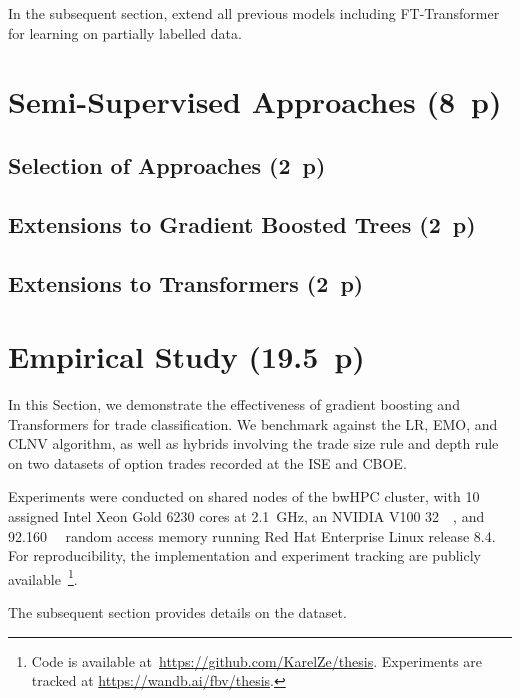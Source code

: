In the subsequent section, extend all previous models including FT-Transformer for learning on partially labelled data.

\newpage
\section{Semi-Supervised Approaches (8~p)}\label{sec:semi-supervised-approaches}

\subsection{Selection of Approaches (2~p)}\label{sec:selection-of-approaches-1}

\subsection{Extensions to Gradient Boosted
    Trees (2~p)}\label{sec:extensions-to-gradient-boosted-trees}

\subsection{Extensions to Transformers (2~p)}\label{sec:extensions-to-transformer}


\newpage
{}
\section{Empirical Study (19.5~p)}\label{sec:empirical-study}

In this Section, we demonstrate the effectiveness of gradient boosting and Transformers for trade classification. We benchmark against the \gls{LR}, \gls{EMO}, and \gls{CLNV} algorithm, as well as hybrids involving the trade size rule and depth rule on two datasets of option trades recorded at the \gls{ISE} and \gls{CBOE}.

Experiments were conducted on shared nodes of the bwHPC cluster, with 10 assigned Intel Xeon Gold 6230 cores at \SI{2.1}{\GHz}, an NVIDIA V100 \SI{32}{\giga\byte}, and \SI{92.160}{\giga\byte} random access memory running Red Hat Enterprise Linux release 8.4. For reproducibility, the implementation and experiment tracking are publicly available~\footnote{Code is available at~\url{https://github.com/KarelZe/thesis}. Experiments are tracked at \url{https://wandb.ai/fbv/thesis}.}.

The subsequent section provides details on the dataset.

